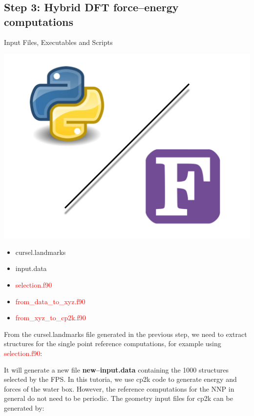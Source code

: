 \documentclass[12pt]{article}
\begin{document}
\subsection{Step 3: Hybrid DFT force--energy computations}
\begin{mybox2}{{Input Files, Executables and Scripts}}
\begin{minipage}[c]{0.5\linewidth}
\includegraphics[scale=0.1]{Python-fortran.jpeg}
\end{minipage}
\begin{minipage}[c]{0.5\linewidth}
\begin{itemize}
    \item cursel.landmarks
    \item input.data
    \item \textcolor{red}{selection.f90}
    \item \textcolor{red}{from\_data\_to\_xyz.f90}
    \item \textcolor{red}{from\_xyz\_to\_cp2k.f90}
\end{itemize}
\end{minipage}
\end{mybox2}

From the cursel.landmarks file generated in the previous step, we need to extract structures for the single point reference computations, for example using \textcolor{red}{selection.f90}:

\begin{center}
\end{center}
It will generate a new file \textbf{new--input.data} containing the 1000 structures selected by the FPS. In this tutoria, we use cp2k code to generate energy and forces of the water box. However, the reference computations for the NNP in general do not need to be periodic. The geometry input files for cp2k can be generated by: 
\end{document}

